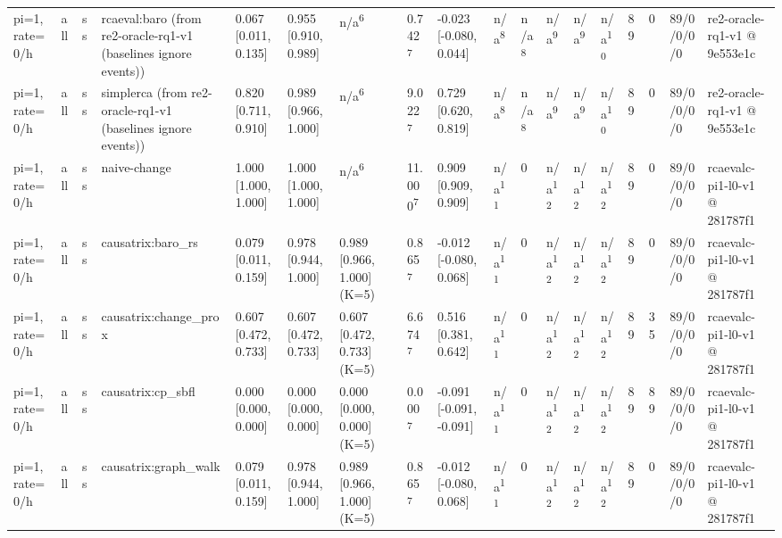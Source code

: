 \begin{table}[t]
\begin{tabular}{llllllllllllllllll}
pi=1, rate=0/h & all & ss & rcaeval:baro (from re2-oracle-rq1-v1 (baselines ignore events)) & 0.067 [0.011, 0.135] & 0.955 [0.910, 0.989] & n/a\textsuperscript{6} & 0.742\textsuperscript{7} & -0.023 [-0.080, 0.044] & n/a\textsuperscript{8} & n/a\textsuperscript{8} & n/a\textsuperscript{9} & n/a\textsuperscript{9} & n/a\textsuperscript{10} & 89 & 0 & 89/0/0/0/0 & re2-oracle-rq1-v1 @ 9e553e1c \\
pi=1, rate=0/h & all & ss & simplerca (from re2-oracle-rq1-v1 (baselines ignore events)) & 0.820 [0.711, 0.910] & 0.989 [0.966, 1.000] & n/a\textsuperscript{6} & 9.022\textsuperscript{7} & 0.729 [0.620, 0.819] & n/a\textsuperscript{8} & n/a\textsuperscript{8} & n/a\textsuperscript{9} & n/a\textsuperscript{9} & n/a\textsuperscript{10} & 89 & 0 & 89/0/0/0/0 & re2-oracle-rq1-v1 @ 9e553e1c \\
pi=1, rate=0/h & all & ss & naive-change & 1.000 [1.000, 1.000] & 1.000 [1.000, 1.000] & n/a\textsuperscript{6} & 11.000\textsuperscript{7} & 0.909 [0.909, 0.909] & n/a\textsuperscript{11} & 0 & n/a\textsuperscript{12} & n/a\textsuperscript{12} & n/a\textsuperscript{12} & 89 & 0 & 89/0/0/0/0 & rcaevalc-pi1-l0-v1 @ 281787f1 \\
pi=1, rate=0/h & all & ss & causatrix:baro\_rs & 0.079 [0.011, 0.159] & 0.978 [0.944, 1.000] & 0.989 [0.966, 1.000] (K=5) & 0.865\textsuperscript{7} & -0.012 [-0.080, 0.068] & n/a\textsuperscript{11} & 0 & n/a\textsuperscript{12} & n/a\textsuperscript{12} & n/a\textsuperscript{12} & 89 & 0 & 89/0/0/0/0 & rcaevalc-pi1-l0-v1 @ 281787f1 \\
pi=1, rate=0/h & all & ss & causatrix:change\_prox & 0.607 [0.472, 0.733] & 0.607 [0.472, 0.733] & 0.607 [0.472, 0.733] (K=5) & 6.674\textsuperscript{7} & 0.516 [0.381, 0.642] & n/a\textsuperscript{11} & 0 & n/a\textsuperscript{12} & n/a\textsuperscript{12} & n/a\textsuperscript{12} & 89 & 35 & 89/0/0/0/0 & rcaevalc-pi1-l0-v1 @ 281787f1 \\
pi=1, rate=0/h & all & ss & causatrix:cp\_sbfl & 0.000 [0.000, 0.000] & 0.000 [0.000, 0.000] & 0.000 [0.000, 0.000] (K=5) & 0.000\textsuperscript{7} & -0.091 [-0.091, -0.091] & n/a\textsuperscript{11} & 0 & n/a\textsuperscript{12} & n/a\textsuperscript{12} & n/a\textsuperscript{12} & 89 & 89 & 89/0/0/0/0 & rcaevalc-pi1-l0-v1 @ 281787f1 \\
pi=1, rate=0/h & all & ss & causatrix:graph\_walk & 0.079 [0.011, 0.159] & 0.978 [0.944, 1.000] & 0.989 [0.966, 1.000] (K=5) & 0.865\textsuperscript{7} & -0.012 [-0.080, 0.068] & n/a\textsuperscript{11} & 0 & n/a\textsuperscript{12} & n/a\textsuperscript{12} & n/a\textsuperscript{12} & 89 & 0 & 89/0/0/0/0 & rcaevalc-pi1-l0-v1 @ 281787f1 \\

\end{tabular}
\end{table}
